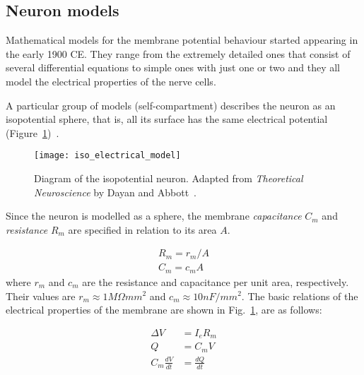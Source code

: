 \subsection{Neuron models}

Mathematical models for the membrane potential behaviour started appearing in the early 1900 CE. They range from the extremely detailed ones that consist of several differential equations to simple ones with just one or two and they all model the electrical properties of the nerve cells. 

A particular group of models (self-compartment) describes the neuron as an isopotential sphere, that is, all its surface has the same electrical potential (Figure~\ref{fig:neuro:isopotential})~\cite{dayan2001theoretical}.

\begin{figure}[hbt]
  \begin{center}
    \texttt{[image: iso\_electrical\_model]}
    \caption{Diagram of the isopotential neuron. Adapted from \emph{Theoretical Neuroscience} by Dayan and Abbott~\cite{dayan2001theoretical}.}
    \label{fig:neuro:isopotential}
  \end{center}
\end{figure}

Since the neuron is modelled as a sphere, the membrane \emph{capacitance} $C_{m}$ and \emph{resistance} $R_{m}$ are specified in relation to its area $A$.

\begin{align}
R_{m} = r_{m}/A \\
C_{m} = c_{m}A
\end{align}
where $r_{m}$ and $c_{m}$ are the resistance and capacitance per unit area, 
respectively. Their values are $r_{m} \approx 1M \Omega mm^{2}$ and $c_{m} 
\approx 10nF/mm^{2}$. The basic relations of the electrical properties of the membrane are shown in  
Fig.~\ref{fig:neuro:isopotential}, are as follows:

\begin{align}
\Delta V &= I_{e}R_{m} \label{eq:neuro:volt-shift}\\[0.5em]
Q &= C_{m}V \label{eq:neuro:charge} \\[0.5em]
C_{m}\frac{dV}{dt} &= \frac{dQ}{dt} \label{eq:neuro:cap-curr}
\end{align}

